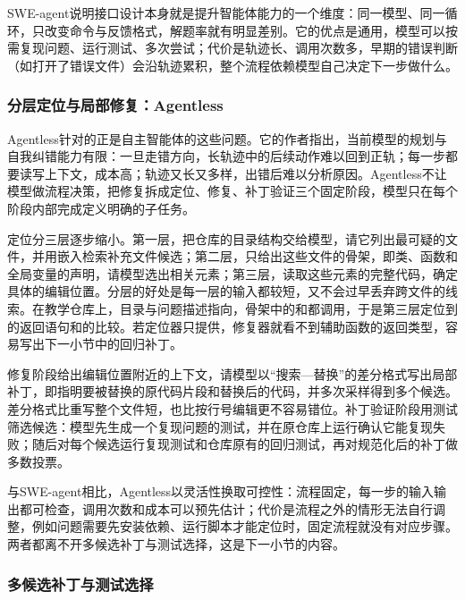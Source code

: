 SWE-agent说明接口设计本身就是提升智能体能力的一个维度：同一模型、同一循环，只改变命令与反馈格式，解题率就有明显差别。它的优点是通用，模型可以按需复现问题、运行测试、多次尝试；代价是轨迹长、调用次数多，早期的错误判断（如打开了错误文件）会沿轨迹累积，整个流程依赖模型自己决定下一步做什么。

\subsubsection{分层定位与局部修复：Agentless}
\label{sec:nlp-execution-agentless}

Agentless针对的正是自主智能体的这些问题。它的作者指出，当前模型的规划与自我纠错能力有限：一旦走错方向，长轨迹中的后续动作难以回到正轨；每一步都要读写上下文，成本高；轨迹又长又多样，出错后难以分析原因。Agentless不让模型做流程决策，把修复拆成定位、修复、补丁验证三个固定阶段，模型只在每个阶段内部完成定义明确的子任务。

定位分三层逐步缩小。第一层，把仓库的目录结构交给模型，请它列出最可疑的文件，并用嵌入检索补充文件候选；第二层，只给出这些文件的骨架，即类、函数和全局变量的声明，请模型选出相关元素；第三层，读取这些元素的完整代码，确定具体的编辑位置。分层的好处是每一层的输入都较短，又不会过早丢弃跨文件的线索。在教学仓库上，目录与问题描述指向，骨架中的和都调用，于是第三层定位到的返回语句和的比较。若定位器只提供，修复器就看不到辅助函数的返回类型，容易写出下一小节中的回归补丁。

修复阶段给出编辑位置附近的上下文，请模型以“搜索—替换”的差分格式写出局部补丁，即指明要被替换的原代码片段和替换后的代码，并多次采样得到多个候选。差分格式比重写整个文件短，也比按行号编辑更不容易错位。补丁验证阶段用测试筛选候选：模型先生成一个复现问题的测试，并在原仓库上运行确认它能复现失败；随后对每个候选运行复现测试和仓库原有的回归测试，再对规范化后的补丁做多数投票。

与SWE-agent相比，Agentless以灵活性换取可控性：流程固定，每一步的输入输出都可检查，调用次数和成本可以预先估计；代价是流程之外的情形无法自行调整，例如问题需要先安装依赖、运行脚本才能定位时，固定流程就没有对应步骤。两者都离不开多候选补丁与测试选择，这是下一小节的内容。

\subsubsection{多候选补丁与测试选择}
\label{sec:nlp-execution-patch-selection}

